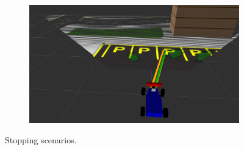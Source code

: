 \begin{figure}[h]
\begin{subfigure}[b]{0.45\linewidth}
  \end{subfigure}
  \begin{subfigure}[b]{0.45\linewidth}
    \includegraphics[width=\linewidth]{figures/experiments/parking-slot-pc.png}
  \end{subfigure}
  \caption[Stopping scenarios]{Stopping scenarios.}
  \label{figure:stop}
\end{figure}
